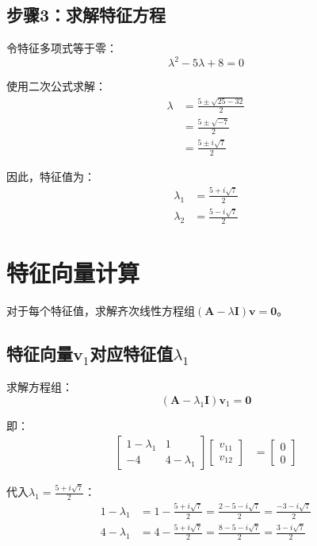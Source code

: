 \documentclass[12pt,a4paper]{article}
\begin{document}
\subsection{步骤3：求解特征方程}

令特征多项式等于零：
\begin{equation}
\lambda^2 - 5\lambda + 8 = 0
\label{eq:characteristic}
\end{equation}

使用二次公式求解：
\begin{align}
\lambda &= \frac{5 \pm \sqrt{25 - 32}}{2} \\
&= \frac{5 \pm \sqrt{-7}}{2} \\
&= \frac{5 \pm i\sqrt{7}}{2}
\end{align}

因此，特征值为：
\begin{align}
\lambda_1 &= \frac{5 + i\sqrt{7}}{2} \\
\lambda_2 &= \frac{5 - i\sqrt{7}}{2}
\end{align}

\section{特征向量计算}

对于每个特征值，求解齐次线性方程组$(\bm{A} - \lambda \bm{I})\bm{v} = \bm{0}$。

\subsection{特征向量$\bm{v}_1$对应特征值$\lambda_1$}

求解方程组：
\begin{equation}
(\bm{A} - \lambda_1 \bm{I})\bm{v}_1 = \bm{0}
\end{equation}

即：
\begin{align}
\begin{bmatrix} 1 - \lambda_1 & 1 \\ -4 & 4 - \lambda_1 \end{bmatrix} \begin{bmatrix} v_{11} \\ v_{12} \end{bmatrix} &= \begin{bmatrix} 0 \\ 0 \end{bmatrix}
\end{align}

代入$\lambda_1 = \frac{5 + i\sqrt{7}}{2}$：
\begin{align}
1 - \lambda_1 &= 1 - \frac{5 + i\sqrt{7}}{2} = \frac{2 - 5 - i\sqrt{7}}{2} = \frac{-3 - i\sqrt{7}}{2} \\
4 - \lambda_1 &= 4 - \frac{5 + i\sqrt{7}}{2} = \frac{8 - 5 - i\sqrt{7}}{2} = \frac{3 - i\sqrt{7}}{2}
\end{align}
\end{document}
